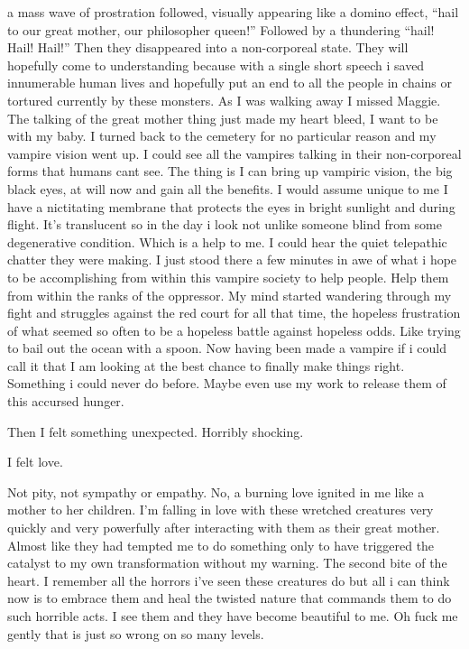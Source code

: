 a mass wave of prostration followed, visually appearing like a domino effect, ``hail to our great mother, our philosopher queen!'' Followed by a thundering ``hail! Hail! Hail!'' Then they disappeared into a non-corporeal state. They will hopefully come to understanding because with a single short speech i saved innumerable human lives and hopefully put an end to all the people in chains or tortured currently by these monsters. As I was walking away I missed Maggie. The talking of the great mother thing just made my heart bleed, I want to be with my baby. I turned back to the cemetery for no particular reason and my vampire vision went up. I could see all the vampires talking in their non-corporeal forms that humans cant see. The thing is I can bring up vampiric vision, the big black eyes, at will now and gain all the benefits. I would assume unique to me I have a nictitating membrane that protects the eyes in bright sunlight and during flight. It's translucent so in the day i look not unlike someone blind from some degenerative condition. Which is a help to me.  I could hear the quiet telepathic chatter they were making. I just stood there a few minutes in awe of what i hope to be accomplishing from within this vampire society to help people. Help them from within the ranks of the oppressor. My mind started wandering through my fight and struggles against the red court for all that time, the hopeless frustration of what seemed so often to be a hopeless battle against hopeless odds. Like trying to bail out the ocean with a spoon. Now having been made a vampire if i could call it that I am looking at the best chance to finally make things right. Something i could never do before. Maybe even use my work to release them of this accursed hunger.\\
\bigskip

Then I felt something unexpected. Horribly shocking.\\
\bigskip

I felt love.\\
\bigskip

Not pity, not sympathy or empathy. No, a burning love ignited in me like a mother to her children. I'm falling in love with these wretched creatures very quickly and very powerfully after interacting with them as their great mother. Almost like they had tempted me to do something only to have triggered the catalyst to my own transformation without my warning. The second bite of the heart. I remember all the horrors i've seen these creatures do but all i can think now is to embrace them and heal the twisted nature that commands them to do such horrible acts. I see them and they have become beautiful to me. Oh fuck me gently that is just so wrong on so many levels.

